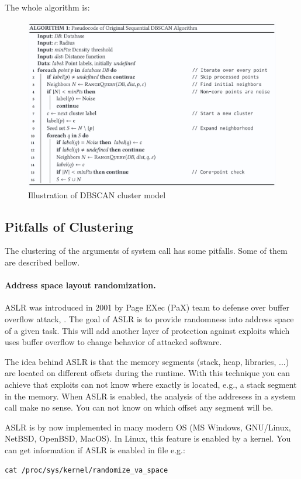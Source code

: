 	The whole algorithm is:
	\nopagebreak
	\begin{figure}[H]
		\centering
		\includegraphics[width=\linewidth]{obrazky-figures/algo_dbscan}
		\caption{Illustration of DBSCAN cluster model}
		\label{dbscan_ilustration}
	\end{figure}


\subsection{Pitfalls of Clustering}
The clustering of the arguments of system call has some pitfalls.
Some of them are described bellow.

\paragraph{Address space layout randomization.}
ASLR was introduced in 2001 by Page EXec (PaX) team to defense over buffer
overflow attack, \cite{ASLR:PAX, Ganz2017}. The goal of ASLR is to provide
randomness into address space of a given task. This will add another layer of
protection against exploits which uses buffer overflow to change behavior of
attacked software.

The idea behind ASLR is that the memory segments (stack, heap, libraries, ...)
are located on different offsets during the runtime. With this technique you can
achieve that exploits can not know where exactly is located, e.g., a stack
segment in the memory. When ASLR is enabled, the analysis of the addresess in
a system call make no sense. You can not know on which offset any segment will be.

ASLR is by now implemented in many modern OS (MS Windows, GNU/Linux, NetBSD, OpenBSD, MacOS).
In Linux, this feature is enabled by a kernel. You can get information if ASLR is enabled in file e.g.:
\begin{center}
	\texttt{cat /proc/sys/kernel/randomize\_va\_space}
\end{center}

